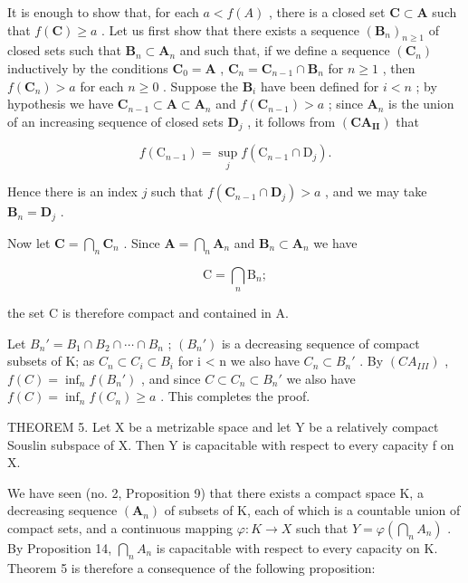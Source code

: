 It is enough to show that, for each \(a < f(A)\) , there is a closed set \(\mathbf{C} \subset \mathbf{A}\) such that \(f(\mathbf{C}) \geqslant a\) . Let us first show that there exists a sequence \((\mathbf{B}_n)_{n \geqslant 1}\) of closed sets such that \(\mathbf{B}_n \subset \mathbf{A}_n\) and such that, if we define a sequence \((\mathbf{C}_n)\) inductively by the conditions \(\mathbf{C}_0 = \mathbf{A}\) , \(\mathbf{C}_n = \mathbf{C}_{n-1} \cap \mathbf{B}_n\) for \(n \geqslant 1\) , then \(f(\mathbf{C}_n) > a\) for each \(n \geqslant 0\) . Suppose the \(\mathbf{B}_i\) have been defined for \(i < n\) ; by hypothesis we have \(\mathbf{C}_{n-1} \subset \mathbf{A} \subset \mathbf{A}_n\) and \(f(\mathbf{C}_{n-1}) > a\) ; since \(\mathbf{A}_n\) is the union of an increasing sequence of closed sets \(\mathbf{D}_j\) , it follows from \((\mathbf{CA}_{\mathbf{II}})\) that

\[
f \left(\mathrm{C} _ {n - 1}\right) = \sup _ {j} f \left(\mathrm{C} _ {n - 1} \cap \mathrm{D} _ {j}\right).
\]

Hence there is an index \(j\) such that \(f(\mathbf{C}_{n-1} \cap \mathbf{D}_j) > a\) , and we may take \(\mathbf{B}_n = \mathbf{D}_j\) .

Now let \(\mathbf{C} = \bigcap_{n}\mathbf{C}_{n}\) . Since \(\mathbf{A} = \bigcap_{n}\mathbf{A}_{n}\) and \(\mathbf{B}_n\subset \mathbf{A}_n\) we have

\[
\mathrm{C} = \bigcap_ {n} \mathrm{B} _ {n};
\]

the set C is therefore compact and contained in A.

Let \(B_n' = B_1 \cap B_2 \cap \cdots \cap B_n\) ; \((B_n')\) is a decreasing sequence of compact subsets of K; as \(C_n \subset C_i \subset B_i\) for i \textless{} n we also have \(C_n \subset B_n'\) . By \((CA_{III})\) , \(f(C) = \inf_{n} f(B_n')\) , and since \(C \subset C_n \subset B_n'\) we also have \(f(C) = \inf_{n} f(C_n) \geqslant a\) . This completes the proof.

THEOREM 5. Let X be a metrizable space and let Y be a relatively compact Souslin subspace of X. Then Y is capacitable with respect to every capacity f on X.

We have seen (no. 2, Proposition 9) that there exists a compact space K, a decreasing sequence \((\mathbf{A}_{n})\) of subsets of K, each of which is a countable union of compact sets, and a continuous mapping \(\varphi: K \to X\) such that \(Y = \varphi\left(\bigcap_{n} A_{n}\right)\) . By Proposition 14, \(\bigcap_{n} A_{n}\) is capacitable with respect to every capacity on K. Theorem 5 is therefore a consequence of the following proposition:

